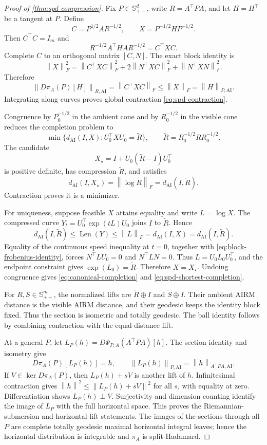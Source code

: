 \documentclass[10pt]{article}
\theoremstyle{plain}
\theoremstyle{definition}
\theoremstyle{remark}
\newcommand{\SPD}{\mathbb S_{++}}
\newcommand{\AI}{\mathrm{AI}}
\newcommand{\fro}[1]{\left\lVert #1\right\rVert_F}
\newcommand{\norm}[1]{\left\lVert #1\right\rVert}
\newcommand{\dai}{d_{\AI}}
\begin{document}
\begin{proof}[Proof of \cref{thm:spd-compression}]
Fix \(P\in\SPD^d\), write \(R=A^\top PA\), and let \(H=H^\top\) be a
tangent at \(P\).  Define
\[
  C=P^{1/2}AR^{-1/2},
  \qquad
  X=P^{-1/2}HP^{-1/2}.
\]
Then \(C^\top C=I_m\) and
\[
  R^{-1/2}A^\top HA R^{-1/2}=C^\top XC.
\]
Complete \(C\) to an orthogonal matrix \([C,N]\).  The exact block identity
is
\begin{equation}
  \fro X^2
  =\fro{C^\top XC}^2
  +2\fro{N^\top XC}^2
  +\fro{N^\top XN}^2.
  \label{eq:block-frobenius-identity}
\end{equation}
Therefore
\[
  \norm{D\pi_A(P)[H]}_{R,\AI}
  =\fro{C^\top XC}
  \le\fro X
  =\norm H_{P,\AI}.
\]
Integrating along curves proves global contraction
\eqref{eq:spd-contraction}.

Congruence by \(P_0^{-1/2}\) in the ambient cone and by \(R_0^{-1/2}\) in
the visible cone reduces the completion problem to
\[
  \min\{\dai(I,X):U_0^\top XU_0=\widetilde R\},
  \qquad
  \widetilde R=R_0^{-1/2}RR_0^{-1/2}.
\]
The candidate
\[
  X_\star=I+U_0(\widetilde R-I)U_0^\top
\]
is positive definite, has compression \(\widetilde R\), and satisfies
\[
  \dai(I,X_\star)=\fro{\log\widetilde R}=\dai(I,\widetilde R).
\]
Contraction proves it is a minimizer.

For uniqueness, suppose feasible \(X\) attains equality and write
\(L=\log X\).  The compressed curve
\(Y_t=U_0^\top\exp(tL)U_0\) joins \(I\) to \(\widetilde R\).  Hence
\[
  \dai(I,\widetilde R)
  \le\operatorname{Len}(Y)
  \le\fro L
  =\dai(I,X)
  =\dai(I,\widetilde R).
\]
Equality of the continuous speed inequality at \(t=0\), together with
\eqref{eq:block-frobenius-identity}, forces
\(N^\top LU_0=0\) and \(N^\top LN=0\).  Thus
\(L=U_0L_0U_0^\top\), and the endpoint constraint gives
\(\exp(L_0)=\widetilde R\).  Therefore \(X=X_\star\).  Undoing congruence
gives \eqref{eq:canonical-completion} and
\eqref{eq:spd-shortest-completion}.

For \(R,S\in\SPD^m\), the normalized lifts are
\(\widetilde R\oplus I\) and \(\widetilde S\oplus I\).  Their ambient AIRM
distance is the visible AIRM distance, and their geodesic keeps the identity
block fixed.  Thus the section is isometric and totally geodesic.  The ball
identity follows by combining contraction with the equal-distance lift.

At a general \(P\), let
\(L_P(h)=D\Psi_{P,A}(A^\top PA)[h]\).  The section identity and isometry give
\[
  D\pi_A(P)[L_P(h)]=h,
  \qquad
  \norm{L_P(h)}_{P,\AI}=\norm h_{A^\top PA,\AI}.
\]
If \(V\in\ker D\pi_A(P)\), then \(L_P(h)+sV\) is another lift of \(h\).
Infinitesimal contraction gives
\(\norm h^2\le\norm{L_P(h)+sV}^2\) for all \(s\), with equality at zero.
Differentiation shows \(L_P(h)\perp V\).  Surjectivity and dimension counting
identify the image of \(L_P\) with the full horizontal space.  This proves
the Riemannian-submersion and horizontal-lift statements.  The images of the
sections through all \(P\) are complete totally geodesic maximal horizontal
integral leaves; hence the horizontal distribution is integrable and
\(\pi_A\) is split-Hadamard.


\end{proof}
\end{document}
